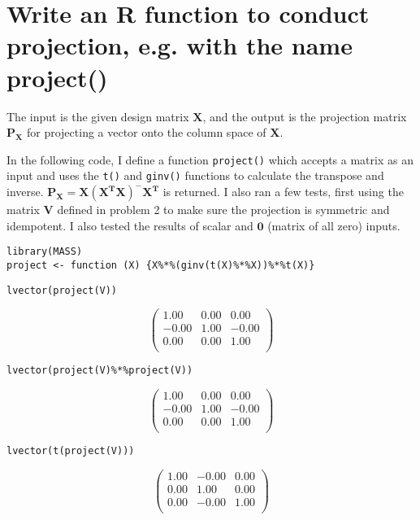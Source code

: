\documentclass[11pt]{article}
\begin{document}
\section{Write an R function to conduct projection, e.g. with the name project()}
\label{sec-4}

The input is the given design matrix $\mathbf{X}$, and the output is
the projection matrix $\mathbf{P_X}$ for projecting a vector onto the
column space of $\mathbf{X}$.

In the following code, I define a function \verb~project()~ which accepts a
matrix as an input and uses the \verb~t()~ and \verb~ginv()~ functions to
calculate the transpose and inverse. $\mathbf{P_X} = \mathbf{X(X^T
X)^{-}X^T}$ is returned. I also ran a few tests, first using the
matrix $\mathbf{V}$ defined in problem 2 to make sure the projection
is symmetric and idempotent. I also tested the results of scalar and
$\mathbf{0}$ (matrix of all zero) inputs.
 

\begin{verbatim}
library(MASS) 
project <- function (X) {X%*%(ginv(t(X)%*%X))%*%t(X)}
\end{verbatim}



\begin{verbatim}
lvector(project(V))
\end{verbatim}

\[ \begin{pmatrix}{} 1.00 & 0.00 & 0.00 \\ -0.00 & 1.00 & -0.00
\\ 0.00 & 0.00 & 1.00 \\ \end{pmatrix} \]


\begin{verbatim}
lvector(project(V)%*%project(V))
\end{verbatim}

\[ \begin{pmatrix}{} 1.00 & 0.00 & 0.00 \\ -0.00 & 1.00 & -0.00
\\ 0.00 & 0.00 & 1.00 \\ \end{pmatrix} \]


\begin{verbatim}
lvector(t(project(V)))
\end{verbatim}

\[ \begin{pmatrix}{} 1.00 & -0.00 & 0.00 \\ 0.00 & 1.00 & 0.00 \\ 0.00
& -0.00 & 1.00 \\ \end{pmatrix} \]
\end{document}
